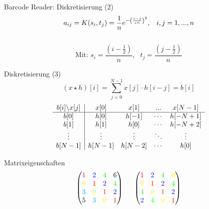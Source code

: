 \documentclass[11pt]{beamer}
\begin{document}
\begin{frame}{Barcode Reader: Diskretisierung (2)}
\[
a_{ij} = K(s_i, t_j) = \frac{1}{n} e^{-\left(i-j \over \varsigma n\right)^2}, \,\,\,\,\, i,j = 1, ..., n
\]

\[\]

\[
\mbox{Mit: } s_i = \frac{(i- \frac{1}{2})}{n}, \,\,\,\, t_j = \frac{(j - \frac{1}{2})}{n}
\]
\end{frame}


\begin{frame}{Diskretisierung (3)}
\[
(x \star h)[i] = \sum\limits_{j=0}^{N-1} x[j] \cdot h[i-j] = b[i]
\]
\linebreak 
\[
\begin{array}{c|cccc}
b[i] \symbol{92} x[j] & x[0] & x[1] & ... & x[N-1]  \\
\hline
b[0]     & h[0] & h[-1] & \cdots & h[-N+1] \\
b[1]     & h[1] & h[0] & \cdots & h[-N+2]  \\
\vdots  & \vdots & \vdots & \ddots & \vdots \\
b[N-1] & h[N-1] & h[N-2] & \cdots & h[0]  \\
\end{array}
\]
\end{frame}


\begin{frame}{Matrixeigenschaften}
\[
\begin{pmatrix}
{\color{red}    1} & {\color{blue}   2} & {\color{green}  4} &                6 \\
{\color{yellow} 0} & {\color{red}    1} & {\color{blue}   2} & {\color{green} 4}\\
{\color{cyan}   3} & {\color{yellow} 0} & {\color{red}    1} & {\color{blue}  2}\\
                5  & {\color{cyan}   3} & {\color{yellow} 0} & {\color{red}   1}\\
\end{pmatrix}
\,\,\,\,\,\,\,\,\,
\begin{pmatrix}
{\color{red}    1} & {\color{blue}   2} & {\color{green}  4} & {\color{yellow} 0}\\
{\color{yellow} 0} & {\color{red}    1} & {\color{blue}   2} & {\color{green}  4}\\
{\color{green}  4} & {\color{yellow} 0} & {\color{red}    1} & {\color{blue}   2}\\
{\color{blue}   2} & {\color{green}  4} & {\color{yellow} 0} & {\color{red}    1}\\
\end{pmatrix}
\]
\end{frame}
\end{document}
